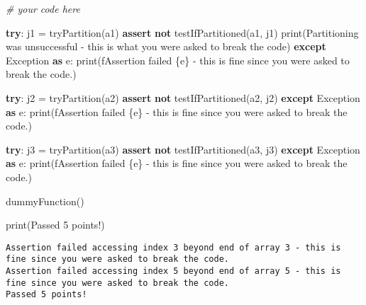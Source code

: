 \documentclass[
]{article}
\newenvironment{Shaded}{}{}
\newcommand{\BuiltInTok}[1]{\textcolor[rgb]{0.00,0.50,0.00}{#1}}
\newcommand{\CommentTok}[1]{\textcolor[rgb]{0.38,0.63,0.69}{\textit{#1}}}
\newcommand{\ControlFlowTok}[1]{\textcolor[rgb]{0.00,0.44,0.13}{\textbf{#1}}}
\newcommand{\ImportTok}[1]{\textcolor[rgb]{0.00,0.50,0.00}{\textbf{#1}}}
\newcommand{\KeywordTok}[1]{\textcolor[rgb]{0.00,0.44,0.13}{\textbf{#1}}}
\newcommand{\NormalTok}[1]{#1}
\newcommand{\OperatorTok}[1]{\textcolor[rgb]{0.40,0.40,0.40}{#1}}
\newcommand{\PreprocessorTok}[1]{\textcolor[rgb]{0.74,0.48,0.00}{#1}}
\newcommand{\SpecialCharTok}[1]{\textcolor[rgb]{0.25,0.44,0.63}{#1}}
\newcommand{\SpecialStringTok}[1]{\textcolor[rgb]{0.73,0.40,0.53}{#1}}
\newcommand{\StringTok}[1]{\textcolor[rgb]{0.25,0.44,0.63}{#1}}
\begin{document}
\begin{Shaded}
\begin{Highlighting}[]
\CommentTok{\# your code here}
\end{Highlighting}
\end{Shaded}

\begin{Shaded}
\begin{Highlighting}[]
\ControlFlowTok{try}\NormalTok{:}
\NormalTok{    j1 }\OperatorTok{=}\NormalTok{ tryPartition(a1)}
    \ControlFlowTok{assert} \KeywordTok{not}\NormalTok{ testIfPartitioned(a1, j1)}
    \BuiltInTok{print}\NormalTok{(}\StringTok{\textquotesingle{}Partitioning was unsuccessful {-} this is what you were asked to break the code\textquotesingle{}}\NormalTok{)}
\ControlFlowTok{except} \PreprocessorTok{Exception} \ImportTok{as}\NormalTok{ e:}
    \BuiltInTok{print}\NormalTok{(}\SpecialStringTok{f\textquotesingle{}Assertion failed }\SpecialCharTok{\{}\NormalTok{e}\SpecialCharTok{\}}\SpecialStringTok{ {-} this is fine since you were asked to break the code.\textquotesingle{}}\NormalTok{)}

\ControlFlowTok{try}\NormalTok{:}
\NormalTok{    j2 }\OperatorTok{=}\NormalTok{ tryPartition(a2)}
    \ControlFlowTok{assert} \KeywordTok{not}\NormalTok{ testIfPartitioned(a2, j2)}
\ControlFlowTok{except} \PreprocessorTok{Exception} \ImportTok{as}\NormalTok{ e:}
    \BuiltInTok{print}\NormalTok{(}\SpecialStringTok{f\textquotesingle{}Assertion failed }\SpecialCharTok{\{}\NormalTok{e}\SpecialCharTok{\}}\SpecialStringTok{ {-} this is fine since you were asked to break the code.\textquotesingle{}}\NormalTok{)}


\ControlFlowTok{try}\NormalTok{:}
\NormalTok{    j3 }\OperatorTok{=}\NormalTok{ tryPartition(a3)}
    \ControlFlowTok{assert} \KeywordTok{not}\NormalTok{ testIfPartitioned(a3, j3)}
\ControlFlowTok{except} \PreprocessorTok{Exception} \ImportTok{as}\NormalTok{ e:}
    \BuiltInTok{print}\NormalTok{(}\SpecialStringTok{f\textquotesingle{}Assertion failed }\SpecialCharTok{\{}\NormalTok{e}\SpecialCharTok{\}}\SpecialStringTok{ {-} this is fine since you were asked to break the code.\textquotesingle{}}\NormalTok{)}

\NormalTok{dummyFunction()}

\BuiltInTok{print}\NormalTok{(}\StringTok{\textquotesingle{}Passed 5 points!\textquotesingle{}}\NormalTok{)}
\end{Highlighting}
\end{Shaded}

\begin{verbatim}
Assertion failed accessing index 3 beyond end of array 3 - this is fine since you were asked to break the code.
Assertion failed accessing index 5 beyond end of array 5 - this is fine since you were asked to break the code.
Passed 5 points!
\end{verbatim}
\end{document}
